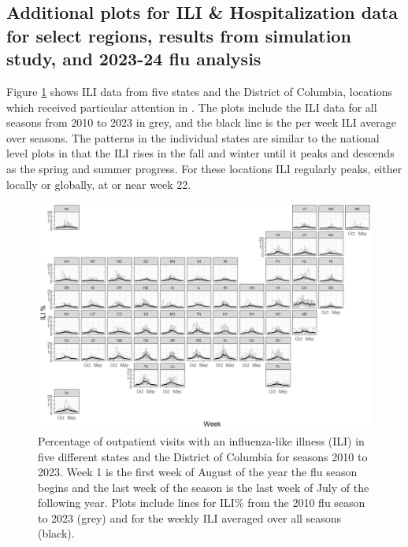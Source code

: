 \documentclass[ba]{imsart}
\theoremstyle{plain}
\theoremstyle{definition}
\theoremstyle{remark}
\begin{document}
\begin{supplement}
\renewcommand{\thesection}{\Alph{section}}

\section{Additional plots for ILI \& Hospitalization data for select regions,
         results from simulation study, and 2023-24 flu analysis}

Figure \ref{fig:ili_vs_week} shows ILI data from five states and the District of Columbia, locations which received particular attention in \cite{osthus2021multiscale}. The plots include the ILI data for all seasons from 2010 to 2023 in grey, and the black line is the per week ILI average over seasons. The patterns in the individual states are similar to the national level plots in that the ILI rises in the fall and winter until it peaks and descends as the spring and summer progress. For these locations ILI regularly peaks, either locally or globally, at or near week 22. 

 \begin{figure}[hbt!]
    \centering
    \includegraphics[scale=.5]{Images/ili_vs_week.png}
    \caption{Percentage of outpatient visits with an influenza-like illness (ILI) in five different states and the District of Columbia for seasons 2010 to 2023. Week 1 is the first week of August of the year the flu season begins and the last week of the season is the last week of July of the following year.
     Plots include lines for ILI\% from the 2010 flu season to 2023 (grey) and for the weekly ILI averaged over all seasons (black).}
    \label{fig:ili_vs_week}
\end{figure}



\end{supplement}
\end{document}
